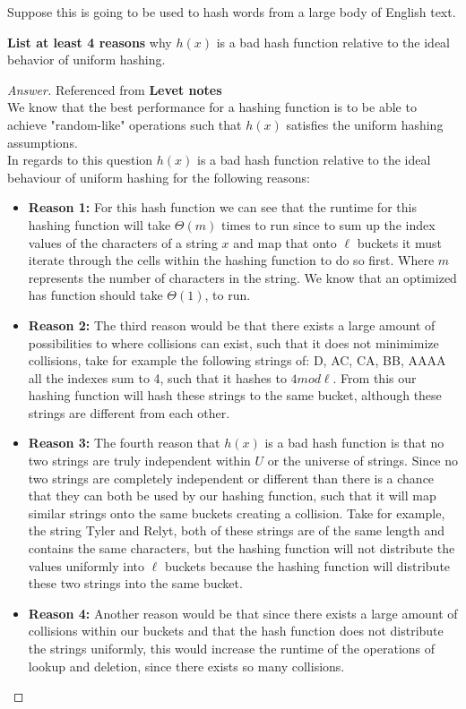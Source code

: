 \documentclass[11pt]{article}
\theoremstyle{definition}
\theoremstyle{definition}
\theoremstyle{definition}
\begin{document}
Suppose this is going to be used to hash words from a large body of English text.
	
\textbf{List at least 4 reasons} why $h(x)$ is a bad hash function relative to the ideal behavior of uniform hashing.

\begin{proof}[Answer] Referenced from \textbf{Levet notes}\\
We know that the best performance for a hashing function is to be able to achieve "random-like" operations such that $h(x)$ satisfies the uniform hashing assumptions. \\

In regards to this question $h(x)$ is a bad hash function relative to the ideal behaviour of uniform hashing for the following reasons: \\
\begin{itemize}
\item \textbf{Reason 1:}
For this hash function we can see that the runtime for this hashing function will take $\Theta(m)$ times to run since to sum up the index values of the characters of a string $x$ and map that onto $\ell$ buckets it must iterate through the cells within the hashing function to do so first. Where $m$ represents the number of characters in the string. We know that an optimized has function should take $\Theta(1)$, to run.
\item \textbf{Reason 2:}
The third reason would be that there exists a large amount of possibilities to where collisions can exist, such that it does not minimimize collisions, take for example the following strings of: D, AC, CA, BB, AAAA all the indexes sum to 4, such that it hashes to $4mod\ell$. From this our hashing function will hash these strings to the same bucket, although these strings are different from each other.
\item \textbf{Reason 3:}
The fourth reason that $h(x)$ is a bad hash function is that no two strings are truly independent within $U$ or the universe of strings. Since no two strings are completely independent or different than there is a chance that they can both be used by our hashing function, such that it will map similar strings onto the same buckets creating a collision. Take for example, the string Tyler and Relyt, both of these strings are of the same length and contains the same characters, but the hashing function will not distribute the values uniformly into $\ell$ buckets because the hashing function will distribute these two strings into the same bucket.
\item \textbf{Reason 4:}
Another reason would be that since there exists a large amount of collisions within our buckets and that the hash function does not distribute the strings uniformly, this would increase the runtime of the operations of lookup and deletion, since there exists so many collisions.
\end{itemize}
\end{proof}
\end{document}
